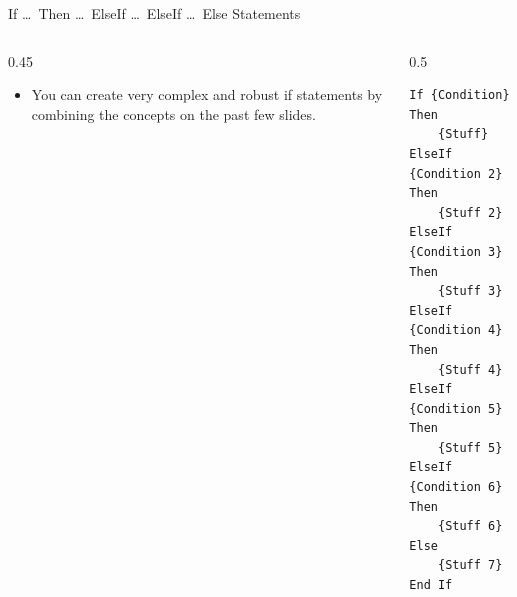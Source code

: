\documentclass{beamer}
\begin{document}
\begin{frame}[fragile]{If \ldots\ Then \ldots\ ElseIf \ldots\ ElseIf \ldots\ Else Statements}
\begin{columns}[T]
\begin{column}{0.45\textwidth}
\begin{itemize}
  \item You can create very complex and robust if statements by combining the concepts
        on the past few slides.
\end{itemize}
\end{column}
\begin{column}{0.5\textwidth}
\begin{lstlisting}[language=VBA]
If {Condition} Then
    {Stuff}
ElseIf {Condition 2} Then
    {Stuff 2}
ElseIf {Condition 3} Then
    {Stuff 3}
ElseIf {Condition 4} Then
    {Stuff 4}
ElseIf {Condition 5} Then
    {Stuff 5}
ElseIf {Condition 6} Then
    {Stuff 6}
Else
    {Stuff 7}
End If
\end{lstlisting}
\end{column}
\end{columns}
\end{frame}
\end{document}
